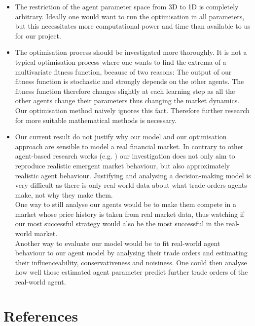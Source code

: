 \documentclass[11pt]{article}
\begin{document}
\begin{itemize}
  \item The restriction of the agent parameter space from 3D to 1D is completely arbitrary. Ideally one would want to run the optimisation in all parameters, but this necessitates more computational power and time than available to us for our project.
  \item The optimisation process should be investigated more thoroughly. It is not a typical optimisation process where one wants to find the extrema of a multivariate fitness function, because of two reasons: The output of our fitness function is stochastic and strongly depends on the other agents. The fitness function therefore changes slightly at each learning step as all the other agents change their parameters thus changing the market dynamics. Our optimisation method naively ignores this fact. Therefore further research for more suitable mathematical methods is necessary.
  \item Our current result do not justify why our model and our optimisation approach are sensible to model a real financial market. In contrary to other agent-based research works (e.g. \citet{raberto2001agent}) our investigation does not only aim to reproduce realistic emergent market behaviour, but also approximately realistic agent behaviour. Justifying and analysing a decision-making model is very difficult as there is only real-world data about what trade orders agents make, not why they make them. \\
  One way to still analyse our agents would be to make them compete in a market whose price history is taken from real market data, thus watching if our most successful strategy would also be the most successful in the real-world market. \\
  Another way to evaluate our model would be to fit real-world agent behaviour to our agent model by analysing their trade orders and estimating their influenceability, conservativeness and noisiness. One could then analyse how well those estimated agent parameter predict further trade orders of the real-world agent.
\end{itemize}


\section{References}


\end{document}
